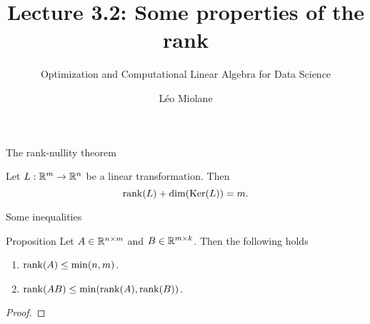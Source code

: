 \documentclass{beamer}
\title{Lecture 3.2: Some properties of the rank}
\subtitle{Optimization and Computational Linear Algebra for Data Science}
\author{Léo Miolane}
\date{}
\begin{document}
\setcounter{showProgressBar}{0}
\setcounter{showSlideNumbers}{0}

\frame{\titlepage}



\setcounter{framenumber}{0}
\setcounter{showSlideNumbers}{1}

\begin{frame}[t]{The rank-nullity theorem}
	\vspace{-0.5cm}
	\begin{theorem}
		Let $L: \mathbb{R}^m \to \mathbb{R}^n$ be a linear transformation. Then
	\vspace{-0.2cm}
		$$
		\rank(L) + \dim(\Ker(L)) = m.
	\vspace{-0.2cm}
		$$
	\end{theorem}
\end{frame}

\begin{frame}[t]{Some inequalities}
	\vspace{-0.5cm}
	\begin{block}{Proposition}
		Let $A \in \mathbb{R}^{n \times m}$ and $B \in \mathbb{R}^{m \times k}$. Then the following holds
		\begin{enumerate}
			\item ${{\rm rank}}(A) \leq \min(n,m)$.
			\item ${{\rm rank}}(AB) \leq \min({{\rm rank}}(A),{{\rm rank}}(B))$.
		\end{enumerate}
	\end{block}
	\vspace{-0.1cm}
	\begin{proof}
		\vfill
		\vspace{4.1cm}
	\end{proof}
	\pause
	\pause
\end{frame}
\end{document}
